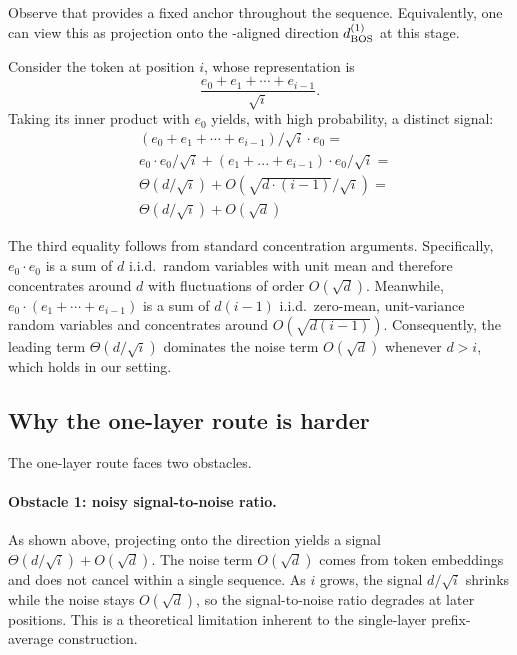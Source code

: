 \documentclass{article}
\theoremstyle{plain}
\theoremstyle{definition}
\theoremstyle{remark}
\begin{document}


Observe that \bos provides a fixed anchor throughout the sequence. Equivalently, one can view this as projection onto the \bos-aligned direction \(d_{\text{BOS}}^{(1)}\) at this stage.

Consider the token at position \(i\), whose representation is
\[
\frac{e_0 + e_1 + \cdots + e_{i-1}}{\sqrt{i}}.
\]
Taking its inner product with \(e_0\) yields, with high probability, a distinct signal:
\begin{align*}
    &(e_0 + e_1 + \cdots + e_{i-1})/\sqrt{i} \cdot e_0 = \\
   &e_0\cdot e_0/\sqrt{i} + (e_1+...+ e_{i-1})\cdot e_0/\sqrt{i} = \\
    &\Theta(d/\sqrt{i}) + O(\sqrt{d\cdot(i-1)}/\sqrt{i}) = \\
     &\Theta(d/\sqrt{i}) + O(\sqrt{d})
\end{align*}

The third equality follows from standard concentration arguments. Specifically, \(e_0 \cdot e_0\) is a sum of \(d\) i.i.d.\ random variables with unit mean and therefore concentrates around \(d\) with fluctuations of order \(O(\sqrt{d})\). Meanwhile,
\(e_0 \cdot (e_1 + \cdots + e_{i-1})\) is a sum of \(d(i-1)\) i.i.d.\ zero-mean, unit-variance random variables and concentrates around \(O(\sqrt{d(i-1)})\).
Consequently, the leading term \(\Theta(d/\sqrt{i})\) dominates the noise term \(O(\sqrt{d})\) whenever \(d > i\), which holds in our setting.

\subsection{Why the one-layer route is harder}
\label{app:1layer_vs_2layer}

The one-layer route faces two obstacles.

\paragraph{Obstacle 1: noisy signal-to-noise ratio.}
As shown above, projecting onto the \bos direction yields a signal $\Theta(d/\sqrt{i}) + O(\sqrt{d})$.
The noise term $O(\sqrt{d})$ comes from \nbos token embeddings and does not cancel within a single sequence.
As $i$ grows, the signal $d/\sqrt{i}$ shrinks while the noise stays $O(\sqrt{d})$, so the signal-to-noise ratio degrades at later positions.
This is a theoretical limitation inherent to the single-layer prefix-average construction.
\end{document}
